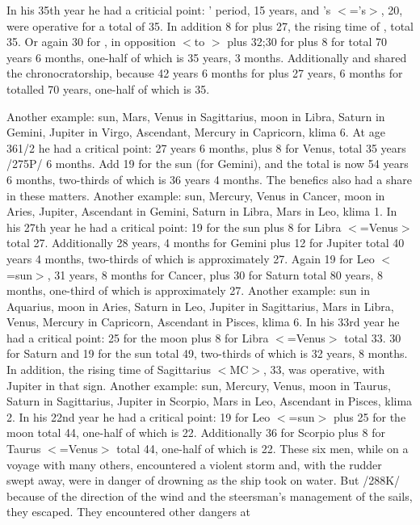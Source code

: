 In his 35th year he had a criticial point: \Mars’ period, 15 years, and \Virgo’s $<$=\Mercury’s$>$, 20, were operative for a total of 35. In addition 8 for \Venus\xspace plus 27, the rising time of \Capricorn, total 35. Or again 30 for \Saturn, in opposition $<$to \Venus$>$
plus 32;30 for \Cancer\xspace plus 8 for \Venus\xspace total 70 years 6 months, one-half of which is 35 years, 3 months. Additionally \Jupiter\xspace and \Saturn\xspace shared the chronocratorship, because 42 years 6 months for \Libra\xspace plus 27 years, 6 months for \Cancer\xspace totalled 70 years, one-half of which is 35.

Another example: sun, Mars, Venus in Sagittarius, moon in Libra, Saturn in Gemini, Jupiter in
Virgo, Ascendant, Mercury in Capricorn, klima 6. At age 361/2 he had a critical point: 27 years 6 months,
plus 8 for Venus, total 35 years /275P/ 6 months. Add 19 for the sun (for Gemini), and the total is now 54
years 6 months, two-thirds of which is 36 years 4 months. The benefics also had a share in these matters.
Another example: sun, Mercury, Venus in Cancer, moon in Aries, Jupiter, Ascendant in Gemini,
Saturn in Libra, Mars in Leo, klima 1. In his 27th year he had a critical point: 19 for the sun plus 8 for
Libra $<$=Venus$>$ total 27. Additionally 28 years, 4 months for Gemini plus 12 for Jupiter total 40 years 4
months, two-thirds of which is approximately 27. Again 19 for Leo $<$=sun$>$, 31 years, 8 months for
Cancer, plus 30 for Saturn total 80 years, 8 months, one-third of which is approximately 27.
Another example: sun in Aquarius, moon in Aries, Saturn in Leo, Jupiter in Sagittarius, Mars in
Libra, Venus, Mercury in Capricorn, Ascendant in Pisces, klima 6. In his 33rd year he had a critical point:
25 for the moon plus 8 for Libra $<$=Venus$>$ total 33. 30 for Saturn and 19 for the sun total 49, two-thirds
of which is 32 years, 8 months. In addition, the rising time of Sagittarius $<$MC$>$, 33, was operative, with Jupiter in that sign.
Another example: sun, Mercury, Venus, moon in Taurus, Saturn in Sagittarius, Jupiter in Scorpio,
Mars in Leo, Ascendant in Pisces, klima 2. In his 22nd year he had a critical point: 19 for Leo $<$=sun$>$
plus 25 for the moon total 44, one-half of which is 22. Additionally 36 for Scorpio plus 8 for Taurus
$<$=Venus$>$ total 44, one-half of which is 22.
These six men, while on a voyage with many others, encountered a violent storm and, with the rudder
swept away, were in danger of drowning as the ship took on water. But /288K/ because of the direction of
the wind and the steersman’s management of the sails, they escaped. They encountered other dangers at
